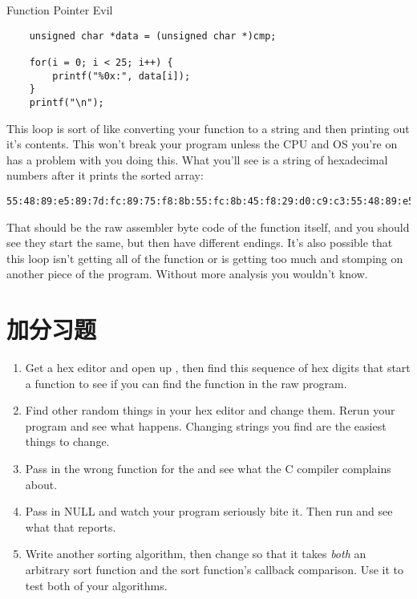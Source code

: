 \begin{code}{Function Pointer Evil}
\begin{lstlisting}
    unsigned char *data = (unsigned char *)cmp;

    for(i = 0; i < 25; i++) {
        printf("%0x:", data[i]);
    }
    printf("\n");
\end{lstlisting}
\end{code}

This loop is sort of like converting your function to a string and then
printing out it's contents.  This won't break your program unless the CPU and
OS you're on has a problem with you doing this.  What you'll see is a string of
hexadecimal numbers after it prints the sorted array:

\begin{Verbatim}
55:48:89:e5:89:7d:fc:89:75:f8:8b:55:fc:8b:45:f8:29:d0:c9:c3:55:48:89:e5:89:
\end{Verbatim}

That should be the raw assembler byte code of the function itself, and you
should see they start the same, but then have different endings.  It's also
possible that this loop isn't getting all of the function or is getting too
much and stomping on another piece of the program.  Without more analysis
you wouldn't know.

\section{加分习题}

\begin{enumerate}
\item Get a hex editor and open up , then find this sequence
    of hex digits that start a function to see if you can find the function
    in the raw program.
\item Find other random things in your hex editor and change them.  Rerun your
    program and see what happens.  Changing strings you find are the easiest
    things to change.
\item Pass in the wrong function for the  and see what
    the C compiler complains about.
\item Pass in NULL and watch your program seriously bite it.  Then run
     and see what that reports.
\item Write another sorting algorithm, then change  so
    that it takes \emph{both} an arbitrary sort function and the sort function's
    callback comparison.  Use it to test both of your algorithms.
\end{enumerate}


